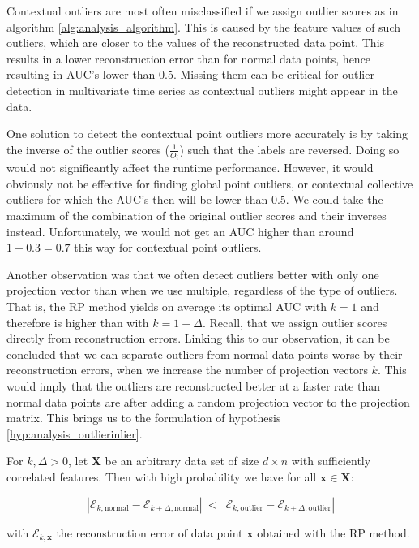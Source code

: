 Contextual outliers are most often misclassified if we assign outlier scores as in algorithm \ref{alg:analysis_algorithm}. This is caused by the feature values of such outliers, which are closer to the values of the reconstructed data point. This results in a lower reconstruction error than for normal data points, hence resulting in AUC's lower than $0.5$. Missing them can be critical for outlier detection in multivariate time series as contextual outliers might appear in the data.

One solution to detect the contextual point outliers more accurately is by taking the inverse of the outlier scores ($\frac{1}{O_i}$) such that the labels are reversed. Doing so would not significantly affect the runtime performance. However, it would obviously not be effective for finding global point outliers, or contextual collective outliers for which the AUC's then will be lower than $0.5$. We could take the maximum of the combination of the original outlier scores and their inverses instead. Unfortunately, we would not get an AUC higher than around $1 - 0.3 = 0.7$ this way for contextual point outliers.

Another observation was that we often detect outliers better with only one projection vector than when we use multiple, regardless of the type of outliers. That is, the RP method yields on average its optimal AUC with $k=1$ and therefore is higher than with $k=1+\Delta$.
Recall, that we assign outlier scores directly from reconstruction errors. Linking this to our observation, it can be concluded that we can separate outliers from normal data points worse by their reconstruction errors, when we increase the number of projection vectors $k$. This would imply that the outliers are reconstructed better at a faster rate than normal data points are after adding a random projection vector to the projection matrix. 
This brings us to the formulation of hypothesis \ref{hyp:analysis_outlierinlier}.


\begin{hypothesis}\label{hyp:analysis_outlierinlier}
	For $k, \Delta > 0$, let $\mathbf{X}$ be an arbitrary data set of size $d \times n$ with sufficiently correlated features.
	Then with high probability we have for all $\mathbf{x} \in \mathbf{X}$:

	\[ |\mathcal{E}_{k,\text{normal}} - \mathcal{E}_{k+\Delta,\text{normal}}| \ < \ |\mathcal{E}_{k,\text{outlier}} - \mathcal{E}_{k+\Delta,\text{outlier}}| \]
	
	\vspace{0.2cm}
	
	\noindent with $\mathcal{E}_{k,\mathbf{x}}$ the reconstruction error of data point $\mathbf{x}$ obtained with the RP method.
\end{hypothesis}

